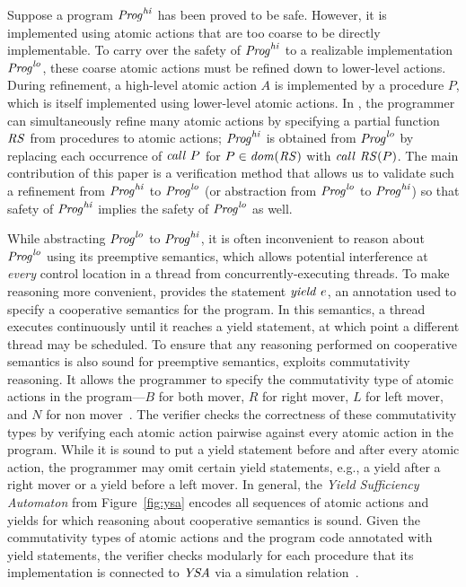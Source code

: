 \newcommand{\hi}{\mathit{hi}}
\newcommand{\lo}{\mathit{lo}}

Suppose a program $\Prog^\hi$ has been proved to be safe.
However, it is implemented using atomic actions that are too coarse to be directly implementable.  
To carry over the safety of $\Prog^\hi$ to a realizable implementation $\Prog^\lo$, 
these coarse atomic actions must be refined down to lower-level actions.
During refinement, a high-level atomic action $A$ is implemented by a procedure $P$, which is itself implemented using lower-level atomic actions.
In \civl, the programmer can simultaneously refine many atomic actions by specifying a partial function $\mathit{RS}$ from procedures to atomic actions;
$\Prog^\hi$ is obtained from $\Prog^\lo$ by replacing each occurrence of $\mathit{call}\ P$ for $P \in \mathit{dom}(\mathit{RS})$ with $\mathit{call}\ \mathit{RS}(P)$.
The main contribution of this paper is a verification method that allows us to validate such a refinement from 
$\Prog^\hi$ to $\Prog^\lo$ (or abstraction from $\Prog^\lo$ to $\Prog^\hi$) so that 
safety of $\Prog^\hi$ implies the safety of $\Prog^\lo$ as well.

While abstracting $\Prog^\lo$ to $\Prog^\hi$, it is often inconvenient to 
reason about $\Prog^\lo$ using its preemptive semantics, which allows potential interference 
at {\em every\/} control location in a thread from concurrently-executing threads.
To make reasoning more convenient, \civl provides the statement $\mathit{yield}\ e$, an annotation 
used to specify a cooperative semantics for the program.
In this semantics, a thread executes continuously until it reaches a yield statement, 
at which point a different thread may be scheduled.
To ensure that any reasoning performed on cooperative semantics is also sound for preemptive semantics,
\civl exploits commutativity reasoning.
It allows the programmer to specify 
the commutativity type of atomic actions in the program---$B$ for both mover, $R$ for right mover, $L$ for left mover, 
and $N$ for non mover~\cite{FlanaganFLQ08}. 
The \civl verifier checks the correctness of these commutativity types by verifying each atomic action pairwise against 
every atomic action in the program.
While it is sound to put a yield statement before and after every atomic action,
the programmer may omit certain yield statements, e.g., a yield after a right mover or a yield before a left mover.
In general, the {\em Yield Sufficiency Automaton\/} from Figure~\ref{fig:ysa} encodes 
all sequences of atomic actions and yields for which reasoning about cooperative semantics is sound.
Given the commutativity types of atomic actions and the program code annotated with yield statements,
the \civl verifier checks modularly for each procedure that its implementation is connected to $\mathit{YSA}$
via a simulation relation~\cite{HenzingerHK95}.

